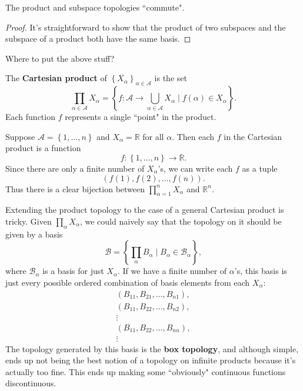 \documentclass[10pt]{report}
\begin{document}
\begin{prop}
	The product and subspace topologies ``commute".
\end{prop}
\begin{proof}
	It's straightforward to show that the product of two subspaces and the subspace of a product both have the same basis.
\end{proof}

{\color{red}Where to put the above stuff?}

\begin{defn}[]
The \textbf{Cartesian product} of $\left\{ X_{\alpha} \right\}_{\alpha \in \mathcal{A}}$ is the set
\[
	\prod_{\alpha \in \mathcal{A}}X_{\alpha} = \left\{ f:\mathcal{A}\to \bigcup_{\alpha\in\mathcal{A}}X_{\alpha}\;\Big|\;f(\alpha) \in X_{\alpha} \right\}.
\] Each function $f$ represents a single ``point" in the product.
\end{defn}

\begin{ex}[]
	Suppose $\mathcal{A}=\left\{ 1,\dots,n \right\}$ and $X_{\alpha}=\mathbb{R}$ for all $\alpha$. Then each $f$ in the Cartesian product is a function
	\[
		f:\left\{ 1,\dots,n \right\}\to \mathbb{R}.
	\] Since there are only a finite number of $X_{\alpha}$'s, we can write each $f$ as a tuple
	\[
		(f(1), f(2), \dots, f(n)).
	\] Thus there is a clear bijection between $\prod_{\alpha=1}^n X_{\alpha}$ and $\mathbb{R}^n$.
\end{ex}

Extending the product topology to the case of a general Cartesian product is tricky. Given $\prod_{\alpha} X_{\alpha}$, we could naively say that the topology on it should be given by a basis
\[
	\mathcal{B} = \left\{ \prod_{\alpha}B_{\alpha}\;\Big|\; B_{\alpha} \in \mathcal{B}_{\alpha} \right\},
\] where $\mathcal{B}_{\alpha}$ is a basis for just $X_{\alpha}$. If we have a finite number of $\alpha$'s, this basis is just every possible ordered combination of basis elements from each $X_{\alpha}$:
\begin{gather*}
	(B_{11}, B_{21}, \dots, B_{n 1}), \\
	(B_{11}, B_{22}, \dots, B_{n 2}), \\
	\vdots \\
	(B_{11}, B_{22}, \dots, B_{n n}), \\
	\vdots
\end{gather*}The topology generated by this basis is the \textbf{box topology}, and although simple, ends up not being the best notion of a topology on infinite products because it's actually too fine. This ends up making some ``obviously" continuous functions discontinuous.
\end{document}
